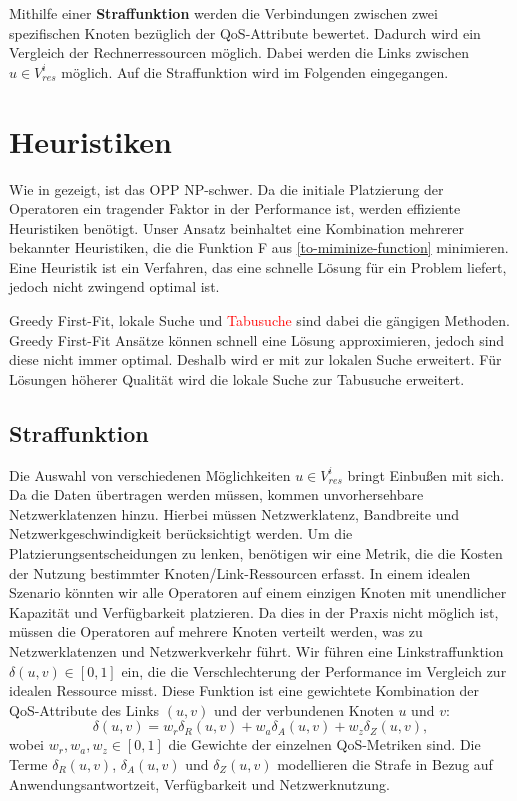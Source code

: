 \documentclass{article}
\begin{document}
Mithilfe einer \textbf{Straffunktion} werden die Verbindungen zwischen zwei spezifischen Knoten bezüglich der QoS-Attribute bewertet. Dadurch wird ein Vergleich 
der Rechnerressourcen möglich. Dabei werden die Links zwischen $u \in V_{res}^i$ möglich. Auf die Straffunktion wird im Folgenden eingegangen. 




\section{Heuristiken} \label{Heurisiken}
Wie in \cite{cardellini-optimal_operatorplc} gezeigt, ist das 
OPP NP-schwer.
Da die initiale Platzierung der Operatoren ein tragender Faktor in der Performance ist, werden effiziente Heuristiken benötigt.
Unser Ansatz beinhaltet eine Kombination mehrerer bekannter Heuristiken, die die Funktion F aus \ref{to-miminize-function} minimieren. 
Eine Heuristik ist ein Verfahren, das eine schnelle Lösung für ein Problem liefert, jedoch nicht zwingend optimal ist. 

Greedy First-Fit, lokale Suche und \textcolor{red}{Tabusuche} sind dabei die gängigen Methoden. 
Greedy First-Fit Ansätze können schnell eine Lösung approximieren, jedoch sind diese nicht immer optimal. Deshalb wird er mit zur lokalen Suche erweitert.
Für Lösungen höherer Qualität wird die lokale Suche zur Tabusuche erweitert.


\subsection{Straffunktion}
Die Auswahl von verschiedenen Möglichkeiten \(u \in V_{res}^i\) bringt Einbußen mit sich. Da die Daten übertragen werden müssen, kommen unvorhersehbare Netzwerklatenzen hinzu. 
Hierbei müssen Netzwerklatenz, Bandbreite und Netzwerkgeschwindigkeit \cite{efficient-operator-placement} berücksichtigt werden.
Um die Platzierungsentscheidungen zu lenken, benötigen wir eine Metrik, die die Kosten der Nutzung bestimmter Knoten/Link-Ressourcen erfasst. 
In einem idealen Szenario könnten wir alle Operatoren auf einem einzigen Knoten mit unendlicher Kapazität und Verfügbarkeit platzieren. 
Da dies in der Praxis nicht möglich ist, müssen die Operatoren auf mehrere Knoten verteilt werden, was zu Netzwerklatenzen und Netzwerkverkehr führt.
Wir führen eine Linkstraffunktion \(\delta(u, v) \in [0, 1]\) ein, die die Verschlechterung der Performance im Vergleich zur idealen Ressource misst. 
Diese Funktion ist eine gewichtete Kombination der QoS-Attribute des Links \((u, v)\) und der verbundenen Knoten \(u\) und \(v\):
\[
\delta(u, v) = w_r \delta_R(u, v) + w_a \delta_A(u, v) + w_z \delta_Z(u, v),
\]
wobei \(w_r, w_a, w_z \in [0, 1]\) die Gewichte der einzelnen QoS-Metriken sind. 
Die Terme \(\delta_R(u, v)\), \(\delta_A(u, v)\) und \(\delta_Z(u, v)\) modellieren die Strafe in Bezug auf Anwendungsantwortzeit, Verfügbarkeit und Netzwerknutzung.
\end{document}
